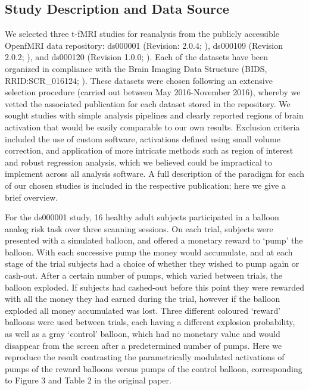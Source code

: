 \subsection{Study Description and Data Source}
We selected three t-fMRI studies for reanalysis from the publicly accessible OpenfMRI data repository: ds000001 (Revision: 2.0.4; \citep{Schonberg2012-oo}), ds000109 (Revision 2.0.2; \citep{Moran2012-cw}), and ds000120 (Revision 1.0.0; \citep{Padmanabhan2011-dc}). Each of the datasets have been organized in compliance with the Brain Imaging Data Structure (BIDS, RRID:SCR\_016124; \citep{Gorgolewski2016-nf}). These datasets were chosen following an extensive selection procedure (carried out between May 2016-November 2016), whereby we vetted the associated publication for each dataset stored in the repository. We sought studies with simple analysis pipelines and clearly reported regions of brain activation that would be easily comparable to our own results. Exclusion criteria included the use of custom software, activations defined using small volume correction, and application of more intricate methods such as region of interest and robust regression analysis, which we believed could be impractical to implement across all analysis software. A full description of the paradigm for each of our chosen studies is included in the respective publication; here we give a brief overview. 

For the ds000001 study, 16 healthy adult subjects participated in a balloon analog risk task over three scanning sessions. On each trial, subjects were presented with a simulated balloon, and offered a monetary reward to `pump' the balloon. With each successive pump the money would accumulate, and at each stage of the trial subjects had a choice of whether they wished to pump again or cash-out. After a certain number of pumps, which varied between trials, the balloon exploded. If subjects had cashed-out before this point they were rewarded with all the money they had earned during the trial, however if the balloon exploded all money accumulated was lost. Three different coloured `reward' balloons were used between trials, each having a different explosion probability, as well as a gray `control' balloon, which had no monetary value and would disappear from the screen after a predetermined number of pumps. Here we reproduce the result contrasting the parametrically modulated activations of pumps of the reward balloons versus pumps of the control balloon, corresponding to Figure 3 and Table 2 in the original paper.

